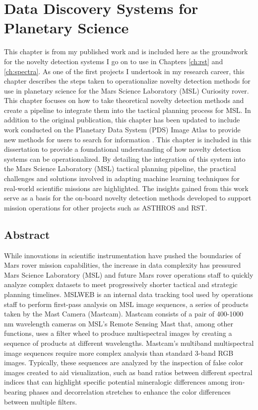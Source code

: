 \chapter[Data Discovery Systems for Planetary Science]{Data Discovery Systems for Planetary Science}
\label{ch:msl}
This chapter is from my published work \cite{horton2021integrating} and is included here as the groundwork for the novelty detection systems I go on to use in Chapters \ref{ch:rst} and \ref{ch:spectra}.
As one of the first projects I undertook in my research career, this chapter describes the steps taken to operationalize novelty detection methods for use in planetary science for the Mars Science Laboratory (MSL) Curiosity rover.
This chapter focuses on how to take theoretical novelty detection methods and create a pipeline to integrate them into the tactical planning process for MSL.
In addition to the original publication, this chapter has been updated to include work conducted on the Planetary Data System (PDS) Image Atlas to provide new methods for users to search for information \parencite{horton2020novelty}.
This chapter is included in this dissertation to provide a foundational understanding of how novelty detection systems can be operationalized.
By detailing the integration of this system into the Mars Science Laboratory (MSL) tactical planning pipeline, the practical challenges and solutions involved in adapting machine learning techniques for real-world scientific missions are highlighted.
The insights gained from this work serve as a basis for the on-board novelty detection methods developed to support mission operations for other projects such as ASTHROS and RST. 

\section{Abstract}
While innovations in scientific instrumentation have pushed the boundaries of Mars rover mission capabilities, the increase in data complexity has pressured Mars Science Laboratory (MSL) and future Mars rover operations staff to quickly analyze complex datasets to meet progressively shorter tactical and strategic planning timelines. 
MSLWEB is an internal data tracking tool used by operations staff to perform first-pass analysis on MSL image sequences, a series of products taken by the Mast Camera (Mastcam). 
Mastcam consists of a pair of 400-1000 nm wavelength cameras on MSL's Remote Sensing Mast that, among other functions, uses a filter wheel to produce multispectral images by creating a sequence of products at different wavelengths. 
Mastcam's multiband multispectral image sequences require more complex analysis than standard 3-band RGB images. 
Typically, these sequences are analyzed by the inspection of false color images created to aid visualization, such as band ratios between different spectral indices that can highlight specific potential mineralogic differences among iron-bearing phases and decorrelation stretches to enhance the color differences between multiple filters. 

